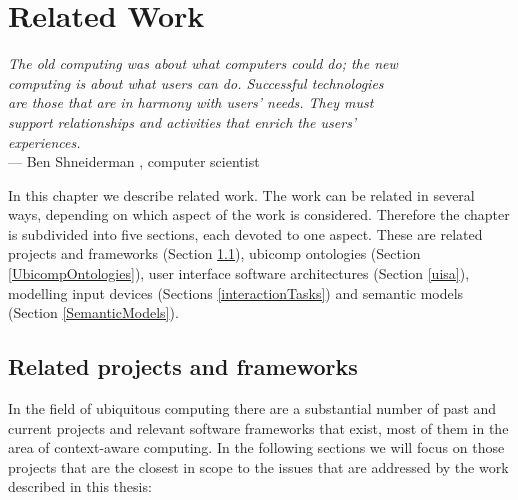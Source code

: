 \chapter{Related Work}

\begin{flushright}{\slshape
The old computing was about what computers could do; the new \\
computing is about what users can do. Successful technologies\\
are those that are in harmony with users' needs. They must \\
support relationships and activities that enrich the users' \\
experiences. } \\ \medskip
	    --- Ben Shneiderman \cite{UbiquityStaff2002}, computer scientist
	\end{flushright}

In this chapter we describe related work. The work can be related in several ways, depending on which aspect of the work is considered. Therefore the chapter is subdivided into five sections, each devoted to one aspect. These are related projects and frameworks (Section \ref{RelatedProjects}), ubicomp ontologies (Section \ref{UbicompOntologies}), user interface software architectures (Section \ref{uisa}), modelling input devices (Sections \ref{interactionTasks}) and semantic models (Section \ref{SemanticModels}).


\section{Related projects and frameworks}
\label{RelatedProjects}
% 
% 

In the field of ubiquitous computing there are a substantial number of past and current projects and relevant software frameworks that exist, most of them in the area of context-aware computing. In the following sections we will focus on those projects that are the closest in scope to the issues that are addressed by the work described in this thesis:

